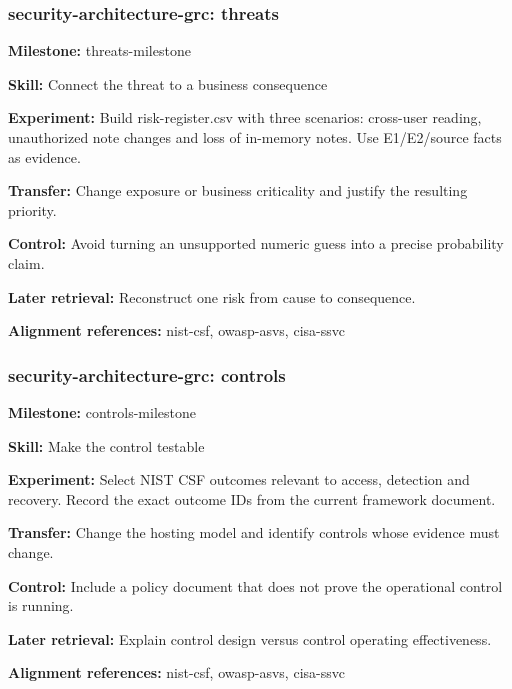 \subsubsection{security-architecture-grc: threats}
\noindent\textbf{Milestone:} threats-milestone\par
\noindent\textbf{Skill:} Connect the threat to a business consequence\par
\noindent\textbf{Experiment:} Build risk-register.csv with three scenarios: cross-user reading, unauthorized note changes and loss of in-memory notes. Use E1/E2/source facts as evidence.\par
\noindent\textbf{Transfer:} Change exposure or business criticality and justify the resulting priority.\par
\noindent\textbf{Control:} Avoid turning an unsupported numeric guess into a precise probability claim.\par
\noindent\textbf{Later retrieval:} Reconstruct one risk from cause to consequence.\par
\noindent\textbf{Alignment references:} nist-csf, owasp-asvs, cisa-ssvc\par
\subsubsection{security-architecture-grc: controls}
\noindent\textbf{Milestone:} controls-milestone\par
\noindent\textbf{Skill:} Make the control testable\par
\noindent\textbf{Experiment:} Select NIST CSF outcomes relevant to access, detection and recovery. Record the exact outcome IDs from the current framework document.\par
\noindent\textbf{Transfer:} Change the hosting model and identify controls whose evidence must change.\par
\noindent\textbf{Control:} Include a policy document that does not prove the operational control is running.\par
\noindent\textbf{Later retrieval:} Explain control design versus control operating effectiveness.\par
\noindent\textbf{Alignment references:} nist-csf, owasp-asvs, cisa-ssvc\par
